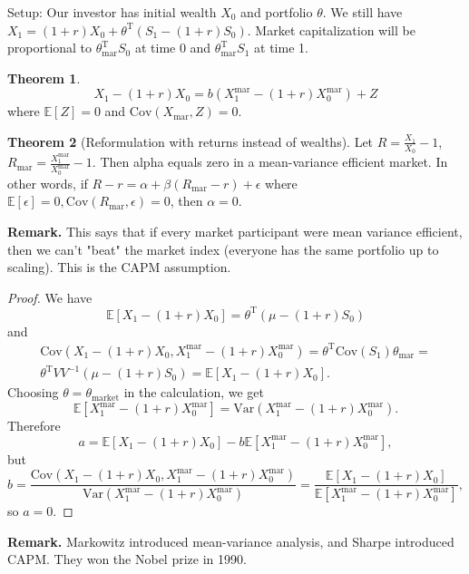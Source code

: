 \documentclass{article}
\theoremstyle{definition}
\newtheorem{theorem}{Theorem}[section]
\begin{document}
Setup: Our investor has initial wealth $X_0$ and portfolio $\theta$. We still have ${X_1 = (1+r)X_0 + \theta^{\text{T}}(S_1 - (1+r)S_0)}$. Market capitalization will be proportional to $\theta_{\text{mar}}^{\text{T}}S_0$ at time 0 and $\theta_{\text{mar}}^{\text{T}}S_1$ at time 1.

\begin{theorem}
    $$X_1 - (1+r)X_0 = b(X_1^{\text{mar}} - (1+r)X_0^{\text{mar}}) + Z$$ where $\mathbb{E}[Z]=0$ and $\text{Cov}(X_{\text{mar}},Z)=0$.
\end{theorem}
\begin{theorem}[Reformulation with returns instead of wealths]
    Let $R = \frac{X_1}{X_0} - 1$, $R_{\text{mar}} = \frac{X_1^{\text{mar}}}{X_0^{\text{mar}}} - 1$. Then alpha equals zero in a mean-variance efficient market. In other words, if $R - r = \alpha + \beta(R_{\text{mar}} - r) + \epsilon$ where $\mathbb{E}[\epsilon] = 0, \text{Cov}(R_{\text{mar}},\epsilon)=0$, then $\alpha = 0$.
\end{theorem}
\textbf{Remark.} This says that if every market participant were mean variance efficient, then we can't "beat" the market index (everyone has the same portfolio up to scaling). This is the CAPM assumption.

\begin{proof}
    We have
    \[
        \mathbb{E}[X_1 - (1+r)X_0] = \theta^{\text{T}}(\mu-(1+r)S_0)    
    \]
    and
    \begin{multline*}
        \text{Cov}(X_1-(1+r)X_0, X_1^{\text{mar}}-(1+r)X_0^{\text{mar}}) = \theta^{\text{T}} \text{Cov}(S_1)\theta_{\text{mar}} =\\ \theta^{\text{T}} V V^{-1} (\mu-(1+r)S_0) = \mathbb{E}[X_1 - (1+r)X_0].
    \end{multline*}
    Choosing $\theta=\theta_{\text{market}}$ in the calculation, we get $$\mathbb{E}[X_1^\text{mar} - (1+r)X_0^{\text{mar}}] = \text{Var}(X_1^{\text{mar}} - (1+r)X_0^{\text{mar}}).$$ 
    Therefore $$a = \mathbb{E}[X_1 - (1+r)X_0] - b \mathbb{E}[X_1^{\text{mar}} - (1+r)X_0^{\text{mar}}],$$ 
    but $$b = \frac{\text{Cov}(X_1-(1+r)X_0,X_1^{\text{mar}}-(1+r)X_0^{\text{mar}})}{\text{Var}(X_1^{\text{mar}}-(1+r)X_0^{\text{mar}})} = \frac{\mathbb{E}[X_1 - (1+r)X_0]}{\mathbb{E}[X_1^{\text{mar}} - (1+r)X_0^{\text{mar}}]},$$
    so $a = 0$.
\end{proof}

\textbf{Remark.} Markowitz introduced mean-variance analysis, and Sharpe introduced CAPM. They won the Nobel prize in 1990.
\end{document}
